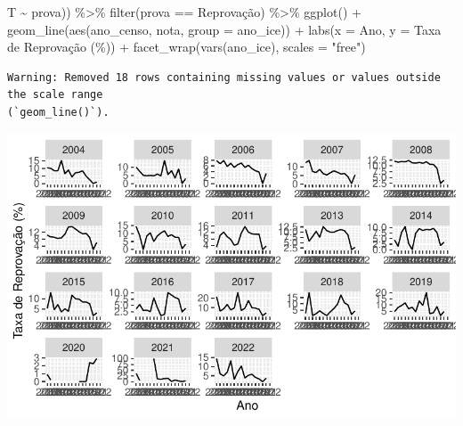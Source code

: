 \documentclass[
  letterpaper,
  DIV=11,
  numbers=noendperiod]{scrartcl}
\newenvironment{Shaded}{\begin{snugshade}}{\end{snugshade}}
\newcommand{\AttributeTok}[1]{\textcolor[rgb]{0.40,0.45,0.13}{#1}}
\newcommand{\FunctionTok}[1]{\textcolor[rgb]{0.28,0.35,0.67}{#1}}
\newcommand{\NormalTok}[1]{\textcolor[rgb]{0.00,0.23,0.31}{#1}}
\newcommand{\SpecialCharTok}[1]{\textcolor[rgb]{0.37,0.37,0.37}{#1}}
\newcommand{\StringTok}[1]{\textcolor[rgb]{0.13,0.47,0.30}{#1}}
\begin{document}
\begin{Shaded}
\begin{Highlighting}[]
\NormalTok{                         T }\SpecialCharTok{\textasciitilde{}}\NormalTok{ prova)) }\SpecialCharTok{\%\textgreater{}\%} 
  \FunctionTok{filter}\NormalTok{(prova }\SpecialCharTok{==} \StringTok{\textquotesingle{}Reprovação\textquotesingle{}}\NormalTok{) }\SpecialCharTok{\%\textgreater{}\%} 
  \FunctionTok{ggplot}\NormalTok{() }\SpecialCharTok{+}
  \FunctionTok{geom\_line}\NormalTok{(}\FunctionTok{aes}\NormalTok{(ano\_censo, nota, }\AttributeTok{group =}\NormalTok{ ano\_ice)) }\SpecialCharTok{+}
  \FunctionTok{labs}\NormalTok{(}\AttributeTok{x =} \StringTok{\textquotesingle{}Ano\textquotesingle{}}\NormalTok{, }\AttributeTok{y =} \StringTok{\textquotesingle{}Taxa de Reprovação (\%)\textquotesingle{}}\NormalTok{) }\SpecialCharTok{+}
  \FunctionTok{facet\_wrap}\NormalTok{(}\FunctionTok{vars}\NormalTok{(ano\_ice), }\AttributeTok{scales =} \StringTok{"free"}\NormalTok{)}
\end{Highlighting}
\end{Shaded}

\begin{verbatim}
Warning: Removed 18 rows containing missing values or values outside the scale range
(`geom_line()`).
\end{verbatim}

\includegraphics{script_files/figure-latex/unnamed-chunk-12-2.pdf}
\end{document}

